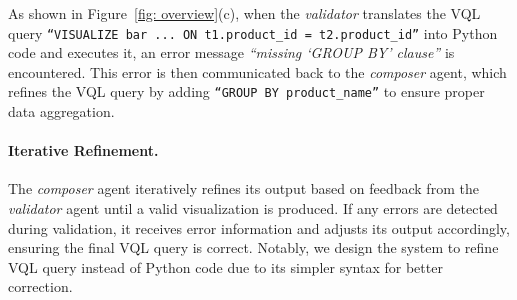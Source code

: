 
As shown in Figure~\ref{fig: overview}(c), when the \textit{validator} translates the VQL query \texttt{``VISUALIZE bar ... ON t1.product\_id = t2.product\_id''} into Python code and executes it, an error message \textit{``missing `GROUP BY' clause''} is encountered. This error is then communicated back to the \textit{composer} agent, which refines the VQL query by adding \texttt{``GROUP BY product\_name''} to ensure proper data aggregation.


\paragraph{Iterative Refinement.}
The \textit{composer} agent iteratively refines its output based on feedback from the \textit{validator} agent until a valid visualization is produced. If any errors are detected during validation, it receives error information and adjusts its output accordingly, ensuring the final VQL query is correct. Notably, we design the system to refine VQL query instead of Python code due to its simpler syntax for better correction.

